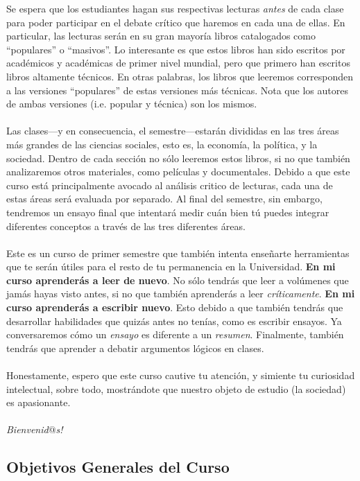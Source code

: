 \documentclass[letterpaper]{article}
\begin{document}
Se espera que los estudiantes hagan sus respectivas lecturas \emph{antes} de cada clase para poder participar en el debate cr\'itico que haremos en cada una de ellas. En particular, las lecturas ser\'an en su gran mayor\'ia libros catalogados como ``populares'' o ``masivos''. Lo interesante es que estos libros han sido escritos por acad\'emicos y acad\'emicas de primer nivel mundial, pero que primero han escritos libros altamente t\'ecnicos. En otras palabras, los libros que leeremos corresponden a las versiones ``populares'' de estas versiones m\'as t\'ecnicas. Nota que los autores de ambas versiones (i.e. popular y t\'ecnica) son los mismos.
\\
\\
Las clases---y en consecuencia, el semestre---estar\'an divididas en las tres \'areas m\'as grandes de las ciencias sociales, esto es, la econom\'ia, la pol\'itica, y la sociedad. Dentro de cada secci\'on no s\'olo leeremos estos libros, si no que tambi\'en analizaremos otros materiales, como pel\'iculas y documentales. Debido a que este curso est\'a principalmente avocado al an\'alisis critico de lecturas, cada una de estas \'areas ser\'a evaluada por separado. Al final del semestre, sin embargo, tendremos un ensayo final que intentar\'a medir cu\'an bien t\'u puedes integrar diferentes conceptos a trav\'es  de las tres diferentes \'areas. 
\\
\\
Este es un curso de primer semestre que tambi\'en intenta ense\~narte herramientas que te ser\'an \'utiles para el resto de tu permanencia en la Universidad. {\bf En mi curso aprender\'as a leer de nuevo}. No s\'olo tendr\'as que leer a vol\'umenes que jam\'as hayas visto antes, si no que tambi\'en aprender\'as a leer \emph{cr\'iticamente}. {\bf En mi curso aprender\'as a escribir nuevo}. Esto debido a que tambi\'en tendr\'as que desarrollar habilidades que quiz\'as antes no ten\'ias, como es escribir ensayos. Ya conversaremos c\'omo un \emph{ensayo} es diferente a un \emph{resumen}. Finalmente, tambi\'en tendr\'as que aprender a debatir argumentos l\'ogicos en clases. 
\\
\\
Honestamente, espero que este curso cautive tu atenci\'on, y simiente tu curiosidad intelectual, sobre todo, mostr\'andote que nuestro objeto de estudio (la sociedad) es apasionante. 
\\
\\
\emph{Bienvenid$@$s!}

\subsection*{Objetivos Generales del Curso}
 
\end{document}
